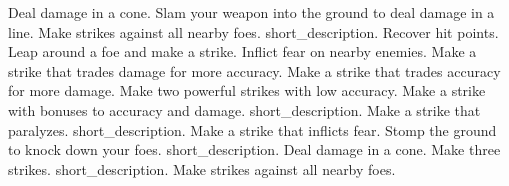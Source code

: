 \begin{spelllist}
 Deal damage in a cone.
 Slam your weapon into the ground to deal damage in a line.
 Make strikes against all nearby foes.
 short_description.
 Recover hit points.
 Leap around a foe and make a strike.
 Inflict fear on nearby enemies.
 Make a strike that trades damage for more accuracy.
 Make a strike that trades accuracy for more damage.
 Make two powerful strikes with low accuracy.
 Make a strike with bonuses to accuracy and damage.
 short_description.
 Make a strike that paralyzes.
 short_description.
 Make a strike that inflicts fear.
 Stomp the ground to knock down your foes.
 short_description.
 Deal damage in a cone.
 Make three strikes.
 short_description.
 Make strikes against all nearby foes.
\end{spelllist}



\small
